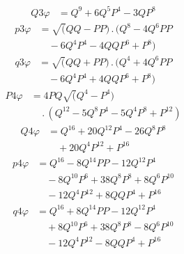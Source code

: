 \[
\begin{aligned}Q3\varphi&=Q^9+6Q^5P^4-3QP^8\end{aligned}
\]
\[
\begin{aligned}p3\varphi&=\surd(QQ-PP)\, .\,(Q^8-4Q^6PP\\[5pt]&\quad{}-6Q^4P^4-4QQP^6+P^8)\end{aligned}
\]
\[
\begin{aligned}q3\varphi&=\surd(QQ+PP)\, .\,(Q^4+4Q^6PP\\[5pt]&\quad{}-6Q^4P^4+4QQP^6+P^8)\end{aligned}
\]
\[
\begin{aligned}P4\varphi&=4PQ\surd(Q^4-P^4)\\[5pt]&\quad{}\, .\,(Q^{12}-5Q^8P^4-5Q^4P^8+P^{12})\end{aligned}
\]
\[
\begin{aligned}Q4\varphi&=Q^{16}+20Q^{12}P^4-26Q^8P^8\\[5pt]&\quad{}+20Q^4P^{12}+P^{16}\end{aligned}
\]
\[
\begin{aligned}p4\varphi&=Q^{16}-8Q^{14}PP-12Q^{12}P^4\\[5pt]&\quad{}-8Q^{10}P^6+38Q^8P^8+8Q^6P^{10}\\[5pt]&\quad{}-12Q^4P^{12}+8QQP^4+P^{16}\end{aligned}
\]
\[
\begin{aligned}q4\varphi&=Q^{16}+8Q^{14}PP-12Q^{12}P^4\\[5pt]&\quad{}+8Q^{10}P^6+38Q^8P^8-8Q^6P^{10}\\[5pt]&\quad{}-12Q^4P^{12}-8QQP^4+P^{16}\end{aligned}
\]


